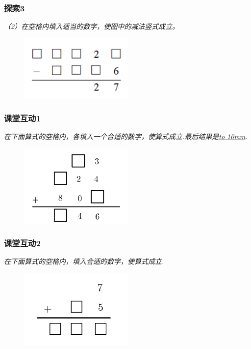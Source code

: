 \begin{frame}
    \frametitle{探索3}
    \textit{（2）在空格内填入适当的数字，使图中的减法竖式成立。}
    \begin{figure}[H] 
        \centering
        \includegraphics[width=0.5\textwidth]{./pics/Chapter_3/tansuo3_2.png}
    \end{figure}
\end{frame}

\begin{frame}
    \frametitle{课堂互动1}
    \textit{在下面算式的空格内，各填入一个合适的数字，使算式成立.最后结果是\underline{\hbox to 10mm{}}.}
    \begin{figure}[H] 
        \centering
        \includegraphics[width=0.5\textwidth]{./pics/Chapter_3/ketanghudong1.png}
    \end{figure}
\end{frame}

\begin{frame}
    \frametitle{课堂互动2}
    \textit{在下面算式的空格内，填入合适的数字，使算式成立.}
    \begin{figure}[H] 
        \centering
        \includegraphics[width=0.5\textwidth]{./pics/Chapter_3/ketanghudong2.png}
    \end{figure}
\end{frame}

